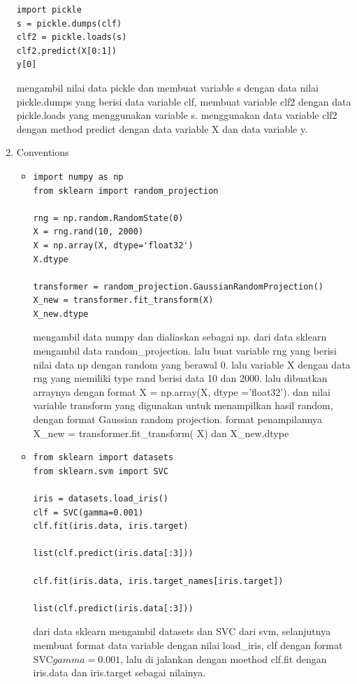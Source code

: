 \begin{enumerate}
\begin{verbatim}
import pickle
s = pickle.dumps(clf)
clf2 = pickle.loads(s)
clf2.predict(X[0:1])
y[0]
\end{verbatim}
\subitem
mengambil nilai data pickle dan membuat variable s dengan data nilai pickle.dumps yang berisi data variable clf, membuat variable clf2 dengan data pickle.loads yang menggunakan variable s. menggunakan data variable clf2 dengan method predict dengan data variable X dan data variable y.

\item
Conventions
\begin{itemize}
\item
\begin{verbatim}
import numpy as np
from sklearn import random_projection

rng = np.random.RandomState(0)
X = rng.rand(10, 2000)
X = np.array(X, dtype='float32')
X.dtype

transformer = random_projection.GaussianRandomProjection()
X_new = transformer.fit_transform(X)
X_new.dtype
\end{verbatim}
\subitem
mengambil data numpy dan dialiaskan sebagai np. dari data sklearn mengambil data random\_projection. lalu buat variable rng yang berisi nilai data np dengan random yang berawal 0. lalu variable X dengan data rng yang memiliki type rand berisi data 10 dan 2000. lalu dibuatkan arraynya dengan format X = np.array(X, dtype ='float32'). dan nilai variable transform yang digunakan untuk menampilkan hasil random, dengan format Gaussian random projection. format penampilannya X\_new = transformer.fit\_transform( X) dan X\_new.dtype

\item
\begin{verbatim}
from sklearn import datasets
from sklearn.svm import SVC

iris = datasets.load_iris()
clf = SVC(gamma=0.001)
clf.fit(iris.data, iris.target)

list(clf.predict(iris.data[:3]))

clf.fit(iris.data, iris.target_names[iris.target])

list(clf.predict(iris.data[:3])) 
\end{verbatim}
\subitem
dari data sklearn mengambil datasets dan SVC dari svm, selanjutnya membuat format data variable dengan nilai load\_iris\(\), clf dengan format SVC\(gamma=0.001\), lalu di jalankan dengan moethod clf.fit dengan iris.data dan iris.target sebagai nilainya.


\end{itemize}
\end{enumerate}
